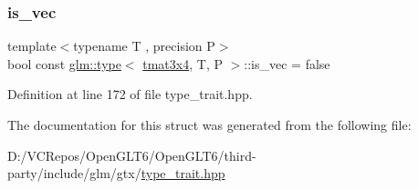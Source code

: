 \subsubsection{\texorpdfstring{is\_vec}{is\_vec}}
{\footnotesize\ttfamily template$<$typename T , precision P$>$ \\
bool const \mbox{\hyperlink{structglm_1_1type}{glm\+::type}}$<$ \mbox{\hyperlink{structglm_1_1tmat3x4}{tmat3x4}}, T, P $>$\+::is\+\_\+vec = false\hspace{0.3cm}{\ttfamily [static]}}



Definition at line 172 of file type\+\_\+trait.\+hpp.



The documentation for this struct was generated from the following file\+:\begin{DoxyCompactItemize}
\item 
D\+:/\+V\+C\+Repos/\+Open\+G\+L\+T6/\+Open\+G\+L\+T6/third-\/party/include/glm/gtx/\mbox{\hyperlink{type__trait_8hpp}{type\+\_\+trait.\+hpp}}\end{DoxyCompactItemize}
